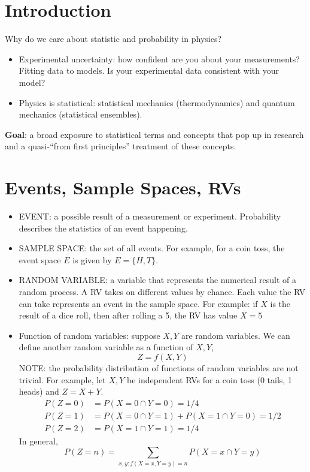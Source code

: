 \documentclass[12pt]{article}
\numberwithin{equation}{section}
\begin{document}
	
\section{Introduction}

Why do we care about statistic and probability in physics?
\begin{itemize}
	\item Experimental uncertainty: how confident are you about your measurements? Fitting data to models. Is your experimental data consistent with your model? 
	\item Physics is statistical: statistical mechanics (thermodynamics) and quantum mechanics (statistical ensembles).
\end{itemize}

\textbf{Goal}: a broad exposure to statistical terms and concepts that pop up in research and a quasi-``from first principles'' treatment of these concepts. 

\section{Events, Sample Spaces, RVs}

\begin{itemize}
	\item EVENT: a possible result of a measurement or experiment. Probability describes the statistics of an event happening.
	\item SAMPLE SPACE: the set of all events. For example, for a coin toss, the event space $ E $ is given by $ E = \{H, T\} $.
	\item RANDOM VARIABLE: a variable that represents the numerical result of a random process.  A RV takes on different values by chance. Each value the RV can take represents an event in the sample space. For example: if $ X $ is the result of a dice roll, then after rolling a 5, the RV has value $ X=5 $
	\item Function of random variables: suppose $ X,Y $ are random variables. We can define another random variable as a function of $ X,Y $,
	\begin{equation}
			Z = f(X,Y)
	\end{equation}
NOTE: the probability distribution of functions of random variables are not trivial. For example, let $ X,Y $ be independent RVs for a coin toss (0 tails, 1 heads) and $ Z = X+Y $.
\begin{align}
	P(Z=0) &= P(X=0\cap Y=0) = 1/4\\
	P(Z=1) &= P(X=0\cap Y=1) + P(X=1\cap Y=0) = 1/2\\
	P(Z=2) &= P(X=1\cap Y=1) = 1/4
\end{align}
In general,
\begin{equation}
		P(Z=n) = \sum_{x,y: f(X=x,Y=y)=n}P(X=x\cap Y=y)
\end{equation}
\end{itemize}
\end{document}
